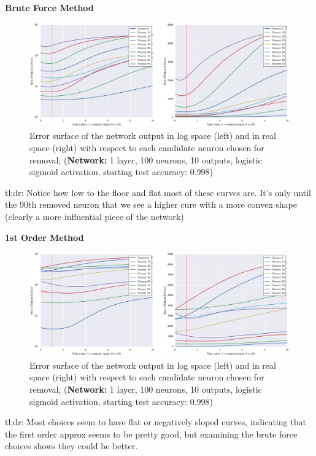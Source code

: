 \textbf{Brute Force Method}
\begin{figure}[!hb]
\centering
\includegraphics[width=\linewidth]{png/mnist-acc99-gt-gain.pdf}
\caption{Error surface of the network output in log space (left) and in real space (right) with respect to each candidate neuron chosen for removal; (\textbf{Network:} 1 layer, 100 neurons, 10 outputs, logistic sigmoid activation, starting test accuracy: 0.998)}
\label{fig:mnist-gt-single-layer}
\end{figure}
tl;dr: Notice how low to the floor and flat most of these curves are. It's only until the 90th removed neuron that we see a higher cure with a more convex shape (clearly a more influential piece of the network)

\textbf{1st Order Method}
\begin{figure}[!hb]
\centering
\includegraphics[width=\linewidth]{png/mnist-acc99-g1-gain.pdf}
\caption{Error surface of the network output in log space (left) and in real space (right) with respect to each candidate neuron chosen for removal; (\textbf{Network:} 1 layer, 100 neurons, 10 outputs, logistic sigmoid activation, starting test accuracy: 0.998)}
\label{fig:mnist-gt-single-layer}
\end{figure}
tl;dr: Most choices seem to have flat or negatively sloped curves, indicating that the first order approx seems to be pretty good, but examining the brute force choices shows they could be better. 

